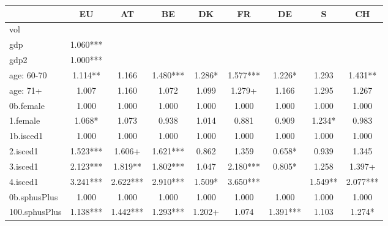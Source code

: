 {
\def\sym#1{\ifmmode^{#1}\else\(^{#1}\)\fi}
\begin{tabular}{l*{8}{c}}
\hline\hline
            &\multicolumn{1}{c}{EU}&\multicolumn{1}{c}{AT}&\multicolumn{1}{c}{BE}&\multicolumn{1}{c}{DK}&\multicolumn{1}{c}{FR}&\multicolumn{1}{c}{DE}&\multicolumn{1}{c}{S}&\multicolumn{1}{c}{CH}\\
\hline
vol         &               &               &               &               &               &               &               &               \\
gdp         &       1.060***&               &               &               &               &               &               &               \\
gdp2        &       1.000***&               &               &               &               &               &               &               \\
age: 60-70  &       1.114** &       1.166   &       1.480***&       1.286*  &       1.577***&       1.226*  &       1.293   &       1.431** \\
age: 71+    &       1.007   &       1.160   &       1.072   &       1.099   &       1.279+  &       1.166   &       1.295   &       1.267   \\
0b.female   &       1.000   &       1.000   &       1.000   &       1.000   &       1.000   &       1.000   &       1.000   &       1.000   \\
1.female    &       1.068*  &       1.073   &       0.938   &       1.014   &       0.881   &       0.909   &       1.234*  &       0.983   \\
1b.isced1   &       1.000   &       1.000   &       1.000   &       1.000   &       1.000   &       1.000   &       1.000   &       1.000   \\
2.isced1    &       1.523***&       1.606+  &       1.621***&       0.862   &       1.359   &       0.658*  &       0.939   &       1.345   \\
3.isced1    &       2.123***&       1.819** &       1.802***&       1.047   &       2.180***&       0.805*  &       1.258   &       1.397+  \\
4.isced1    &       3.241***&       2.622***&       2.910***&       1.509*  &       3.650***&               &       1.549** &       2.077***\\
0b.sphusPlus&       1.000   &       1.000   &       1.000   &       1.000   &       1.000   &       1.000   &       1.000   &       1.000   \\
100.sphusPlus&       1.138***&       1.442***&       1.293***&       1.202+  &       1.074   &       1.391***&       1.103   &       1.274*  \\

\end{tabular}}

